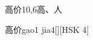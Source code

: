 \begin{entry}{高价}{10,6}{⾼、⼈}
  \begin{phonetics}{高价}{gao1 jia4}[][HSK 4]
  \end{phonetics}
\end{entry}
